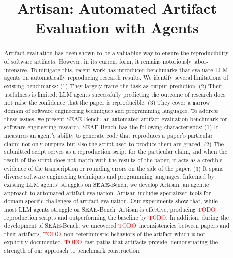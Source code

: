\documentclass[acmsmall,screen,review,anonymous]{acmart}
\begin{document}
\newcommand\benchmark{SEAE-Bench}
\newcommand\approach{Artisan}

\newcommand\goodscript{particular reproduction script}
\newcommand\newbug{paper-artifact inconsistencies}
\newcommand\fastpath{fast-path}

\newcommand\papersetsize{30}
\newcommand\tasksetsize{162}

\newcommand\todo[1]{\textcolor{red}{TODO: #1}}
\newcommand\artisanpartial{\textcolor{red}{TODO}}
\newcommand\artisanpartialoutperform{\textcolor{red}{TODO}}
\newcommand\nondetsize{\textcolor{red}{TODO}}
\newcommand\inconsistenciessize{\textcolor{red}{TODO}}
\newcommand\fastpathsize{\textcolor{red}{TODO}}

\title{Artisan: Automated Artifact Evaluation with Agents}
\begin{abstract}
Artifact evaluation has been shown to be a valuablue way to ensure the reproducibility of software artifacts.
However, in its current form, it remains notoriously labor-intensive.
To mitigate this, recent work has introduced benchmarks that evaluate LLM agents on automatically reproducing research results.
We identify several limitations of existing benchmarks:
(1) They largely frame the task as output prediction.
(2) Their usefulness is limited: LLM agents successfully predicting the outcome of research does not raise the confidence that the paper is reproducible.
(3) They cover a narrow domain of software engineering techniques and programming languages.
To address these issues, we present \benchmark, an automated artifact evaluation benchmark for software engineering research.
\benchmark~has the following characteristics:
(1) It measures an agent’s ability to generate code that reproduces a paper’s particular claim; not only outputs but also the script used to produce them are graded.
(2) The submitted script serves as a reproduction script for the particular claim, and when the result of the script does not match with the results of the paper, it acts as a credible evidence of the transcription or rounding errors on the side of the paper.
(3) It spans diverse software engineering techniques and programming languages.
Informed by existing LLM agents’ struggles on \benchmark, we develop Artisan, an agentic approach to automated artifact evaluation.
Artisan includes specialized tools for domain-specific challenges of artifact evaluation.
Our experiments show that, while most LLM agents struggle on \benchmark, Artisan is effective, producing \artisanpartial{} reproduction scripts and outperforming the baseline by \artisanpartialoutperform{}.
In addition, during the development of \benchmark, we uncovered \inconsistenciessize~inconsistencies between papers and their artifacts, \nondetsize~non-deterministic behaviors of the artifact which is not explicitly documented, \fastpathsize~fast paths that artifacts provide, demonstrating the strength of our approach to benchmark construction.
\end{abstract}
\maketitle










\end{document}
